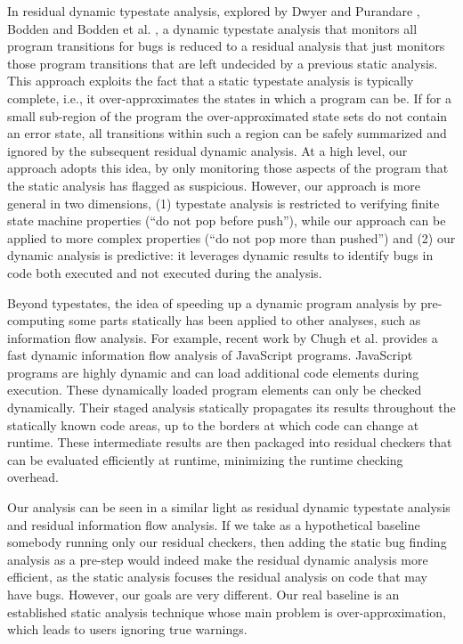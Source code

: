 In residual dynamic typestate analysis, explored by Dwyer and Purandare
\cite{dwyer07residual}, Bodden \cite{bodden10efficient} and Bodden et al.
\cite{bodden07staged}, a dynamic typestate analysis that monitors all
program transitions for bugs is reduced to a residual analysis that
just monitors those program transitions that are left undecided by a
previous static analysis. This approach exploits the fact that a
static typestate analysis is typically complete, i.e., it
over-approximates the states in which a program can be. If for a small
sub-region of the program the over-approximated state sets do not
contain an error state, all transitions within such a region can
be safely summarized and ignored by the subsequent residual
dynamic analysis. At a high level, our approach adopts this idea, by
only monitoring those aspects of the program that the static analysis
has flagged as suspicious. However, our approach is more general in
two dimensions, (1) typestate analysis is restricted to verifying
finite state machine properties (``do not pop before push''), while
our approach can be applied to more complex properties (``do not pop
more than pushed'') and (2) our dynamic analysis is predictive: it
leverages dynamic results to identify bugs in code both executed and
not executed during the analysis.

Beyond typestates, the idea of speeding up a dynamic program analysis
by pre-computing some parts statically has been applied to other
analyses, such as information flow analysis. For example, recent work
by Chugh et al. \cite{chugh09staged} provides a fast dynamic
information flow analysis of JavaScript programs. JavaScript programs
are highly dynamic and can load additional code elements during
execution. These dynamically loaded program elements can only be
checked dynamically. Their staged analysis statically propagates its
results throughout the statically known code areas, up to the borders
at which code can change at runtime. These intermediate results are
then packaged into residual checkers that can be evaluated efficiently
at runtime, minimizing the runtime checking overhead.

Our analysis can be seen in a similar light as residual dynamic typestate analysis and residual information flow analysis. If we take as a hypothetical baseline somebody running only our residual checkers, then adding the static bug finding analysis as a pre-step would indeed make the residual dynamic analysis more efficient, as the static analysis focuses the residual analysis on code that may have bugs. However, our goals are very different. Our 
real baseline is an established static analysis technique whose main problem is over-approximation, which leads to users ignoring true warnings. 

